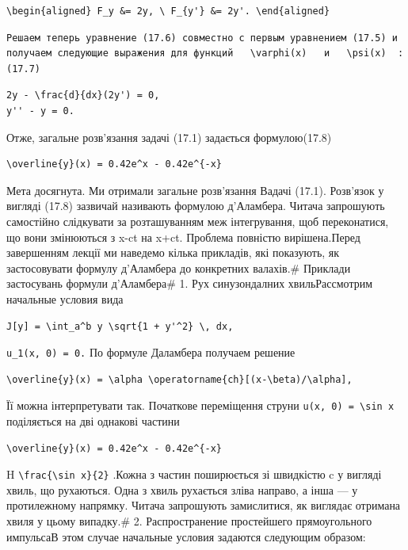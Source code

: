 \documentclass[
  ukrainian,
]{article}
\begin{document}
\begin{verbatim}
\begin{aligned} F_y &= 2y, \ F_{y'} &= 2y'. \end{aligned}
\end{verbatim}

\begin{verbatim}
Решаем теперь уравнение (17.6) совместно с первым уравнением (17.5) и получаем следующие выражения для функций   \varphi(x)   и   \psi(x)  :(17.7)
\end{verbatim}

\begin{verbatim}
2y - \frac{d}{dx}(2y') = 0,
y'' - y = 0.
\end{verbatim}

Отже, загальне розв'язання задачі (17.1) задається формулою(17.8)

\begin{verbatim}
\overline{y}(x) = 0.42e^x - 0.42e^{-x}
\end{verbatim}

Мета досягнута. Ми отримали загальне розв'язання Вадачі (17.1).
Розв'язок у вигляді (17.8) зазвичай називають формулою д'Аламбера.
Читача запрошують самостійно слідкувати за розташуванням меж
інтегрування, щоб переконатися, що вони змінюються з x-ct на x+ct.
Проблема повністю вирішена.Перед завершенням лекції ми наведемо кілька
прикладів, які показують, як застосовувати формулу д'Аламбера до
конкретних валахів.\# Приклади застосувань формули д'Аламбера\# 1. Рух
синузондалних хвильРассмотрим начальные условия вида

\begin{verbatim}
J[y] = \int_a^b y \sqrt{1 + y'^2} \, dx,
\end{verbatim}

\texttt{u\_1(x,\ 0)\ =\ 0.} По формуле Даламбера получаем решение

\begin{verbatim}
\overline{y}(x) = \alpha \operatorname{ch}[(x-\beta)/\alpha],
\end{verbatim}

Її можна інтерпретувати так. Початкове переміщення струни
\texttt{u(x,\ 0)\ =\ \textbackslash{}sin\ x} поділяється на дві однакові
частини

\begin{verbatim}
\overline{y}(x) = 0.42e^x - 0.42e^{-x}
\end{verbatim}

H \texttt{\textbackslash{}frac\{\textbackslash{}sin\ x\}\{2\}} .Кожна з
частин поширюється зі швидкістю c у вигляді хвиль, що рухаються. Одна з
хвиль рухається зліва направо, а інша --- у протилежному напрямку.
Читача запрошують замислитися, як виглядає отримана хвиля у цьому
випадку.\# 2. Распространение простейшего прямоугольного импульсаВ этом
случае начальные условия задаются следующим образом:
\end{document}
